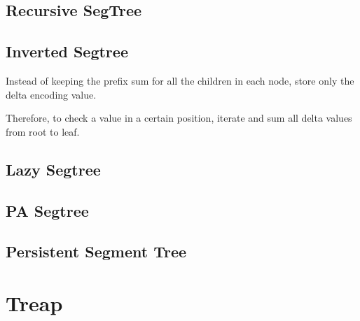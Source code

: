     \subsection{Recursive SegTree}



    \vspace{5pts}

    \subsection{Inverted Segtree}

        Instead of keeping the prefix sum for all the children in each node, store only the delta encoding value.

        Therefore, to check a value in a certain position, iterate and sum all delta values from root to leaf.


    \subsection{Lazy Segtree}


    \subsection{PA Segtree}


    \subsection{Persistent Segment Tree}

        
\section{Treap}

